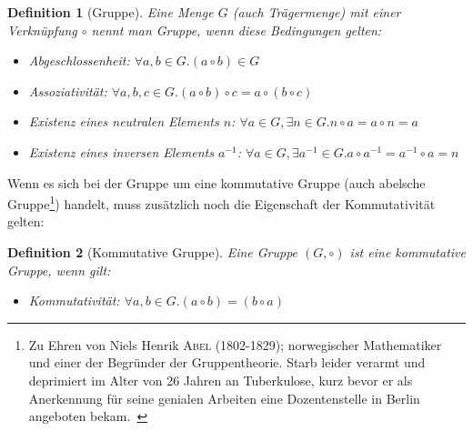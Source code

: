 \documentclass[12pt,a4paper, usenames, dvipsnames]{article}
\theoremstyle{mystyle}
\newtheorem{definition}{Definition}
\theoremstyle{definition}
\begin{document}
\begin{definition}[Gruppe]
Eine Menge $G$ (auch Trägermenge) mit einer Verknüpfung $\circ$ nennt man Gruppe, wenn diese Bedingungen gelten: 
\begin{itemize}
\item Abgeschlossenheit: $\forall a,b \in G.(a \circ b) \in G $
\item Assoziativität: $\forall a,b,c \in G.(a \circ b) \circ c = a \circ (b \circ c)$
\item Existenz eines neutralen Elements $n$: $\forall a \in G, \exists n \in G.n \circ a = a \circ n = a$ 
\item Existenz eines inversen Elements $a^{-1}$: $\forall a \in G, \exists a^{-1} \in G. a \circ a^{-1} = a^{-1} \circ a = n$ 
\end{itemize}
\end{definition}

Wenn es sich bei der Gruppe um eine kommutative Gruppe (auch abelsche Gruppe\footnote{\glqq Zu Ehren von Niels Henrik \textsc{Abel} (1802-1829); norwegischer Mathematiker und einer der Begründer der Gruppentheorie. Starb leider verarmt und deprimiert im Alter von 26 Jahren an Tuberkulose, kurz bevor er als Anerkennung für seine genialen Arbeiten  eine Dozentenstelle in Berlin angeboten bekam.\grqq \  \cite[S.21, Z.23]{Buch}}) handelt, muss zusätzlich noch die Eigenschaft der Kommutativität gelten: 

\begin{definition}[Kommutative Gruppe]
Eine Gruppe $(G, \circ)$ ist eine kommutative Gruppe, wenn gilt:
\begin{itemize}
\item Kommutativität: $\forall a,b \in G.(a \circ b) = (b \circ a) $
\end{itemize}
\end{definition}
\vspace*{0.1cm}
\end{document}
